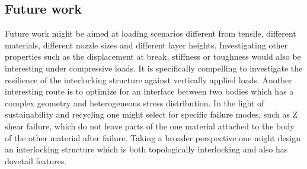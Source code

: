 \subsection{Future work}
Future work might be aimed at loading scenarios different from tensile, different materials, different nozzle sizes and different layer heights.
Investigating other properties such as the displacement at break, stiffness or toughness would also be interesting under compressive loads.
It is specifically compelling to investigate the resilience of the interlocking structure against vertically applied loads.
Another interesting route is to optimize for an interface between two bodies which has a complex geometry and heterogeneous stress distribution.
In the light of sustainability and recycling one might select for specific failure modes, such as Z shear failure, which do not leave parts of the one material attached to the body of the other material after failure.
Taking a broader perspective one might design an interlocking structure which is both topologically interlocking and also has dovetail features.

\iffalse
If the design constraint on the length of the transitional structure between the two material is released,
the manufacturing constraints are less relevant, which means that the geometry of the structure is less restricted.
The geometry of the \revise{microstructure}{lattice}s could then be optimized for tailored mechanical properties.
In fact, such multi-material \revise{microstructure}{lattice}s could be tailored for functionally graded materials.
With a relatively large geometry of the functionally graded multi-material lattice structure,
the ITI\revise{M}{L} lattice can again be used to ensure connectivity between the two materials,
while the meso-scale structure could be used to guarantee the functionally graded mechanical properties.
\fi
